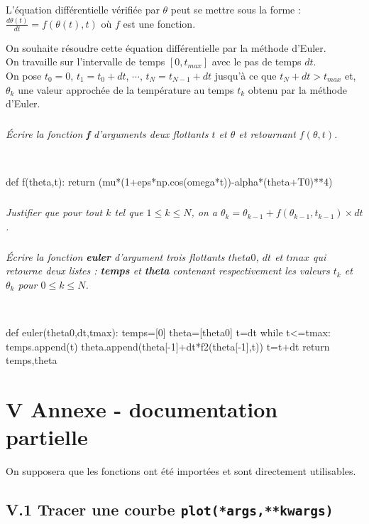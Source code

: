 \documentclass[10pt,fleqn]{article} %
\begin{document}
L'équation différentielle vérifiée par $\theta$ peut se mettre sous la forme :
$\frac{d\theta(t)}{dt} =f(\theta(t),t)$ où $f$ est une fonction.

On souhaite résoudre cette équation différentielle par la méthode d'Euler.\\
On travaille sur l'intervalle de temps $[0,t_{max}]$ avec le pas de temps $d t$.\\
On pose $t_0=0$, $t_1=t_0+dt$, $\cdots$, $t_N=t_{N-1}+dt$ jusqu'à ce que $t_N+dt>t_{max}$
et, $\theta_k$ une valeur approchée de la température au temps $t_k$ obtenu par la méthode d'Euler.\\

\subparagraph{}
\textit{Écrire la  fonction \textbf{f} d'arguments deux flottants $t$ et $\theta$ et retournant 
$f(\theta,t)$.}

\ifprof
\begin{corrige}~\
\begin{python}
def f(theta,t):
    return (mu*(1+eps*np.cos(omega*t))-alpha*(theta+T0)**4)
\end{python}
\end{corrige}
\else
\fi

\subparagraph{} 
\textit{Justifier que pour tout $k$ tel que $1 \leq k \leq N$, on a 
$\theta_{k}=\theta_{k-1}+f(\theta_{k-1},t_{k-1}) \times dt$.}

\subparagraph{} 
\textit{Écrire la fonction \textbf{euler} d'argument trois flottants $theta0$, $dt$ et $tmax$ qui retourne 
deux listes : \textbf{temps} et \textbf{theta} contenant respectivement les valeurs 
$t_k$ et $\theta_k$ pour $0\leq k \leq N$.}

\ifprof
\begin{corrige}~\
\begin{python}
def euler(theta0,dt,tmax):
    temps=[0]
    theta=[theta0]
    t=dt
    while t<=tmax:
        temps.append(t)
        theta.append(theta[-1]+dt*f2(theta[-1],t))
        t=t+dt
    return temps,theta
\end{python}
\end{corrige}
\else
\fi

\section*{V \quad Annexe - documentation partielle}

On supposera que les fonctions ont \'et\'e import\'ees et sont directement utilisables.


\subsection*{V.1 \quad Tracer une courbe {\tt plot(*args,**kwargs)}}
\end{document}
